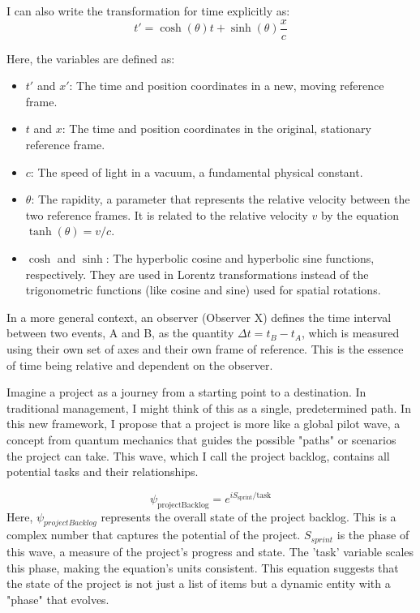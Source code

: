 \documentclass{article}
\begin{document}
 I can also write the transformation for time explicitly as:
 $$ t' = \cosh(\theta) t + \sinh(\theta) \frac{x}{c} $$
 
 Here, the variables are defined as:
 \begin{itemize}
 	\item $t'$ and $x'$: The time and position coordinates in a new, moving reference frame.
 	\item $t$ and $x$: The time and position coordinates in the original, stationary reference frame.
 	\item $c$: The speed of light in a vacuum, a fundamental physical constant.
 	\item $\theta$: The rapidity, a parameter that represents the relative velocity between the two reference frames. It is related to the relative velocity $v$ by the equation $\tanh(\theta) = v/c$.
 	\item $\cosh$ and $\sinh$: The hyperbolic cosine and hyperbolic sine functions, respectively. They are used in Lorentz transformations instead of the trigonometric functions (like cosine and sine) used for spatial rotations.
 \end{itemize}
 
 In a more general context, an observer (Observer X) defines the time interval between two events, A and B, as the quantity $\Delta t = t_B - t_A$, which is measured using their own set of axes and their own frame of reference. This is the essence of time being relative and dependent on the observer.


Imagine a project as a journey from a starting point to a destination. In traditional management, I might think of this as a single, predetermined path. In this new framework, I propose that a project is more like a global pilot wave, a concept from quantum mechanics that guides the possible "paths" or scenarios the project can take. This wave, which I call the project backlog, contains all potential tasks and their relationships.

\begin{equation}
\psi_{\text{projectBacklog}} = e^{iS_{\text{sprint}}/\text{task}}
\end{equation}
Here, $\psi_{projectBacklog}$ represents the overall state of the project backlog. This is a complex number that captures the potential of the project. $S_{sprint}$ is the phase of this wave, a measure of the project's progress and state. The 'task' variable scales this phase, making the equation's units consistent. This equation suggests that the state of the project is not just a list of items but a dynamic entity with a "phase" that evolves.
\end{document}
